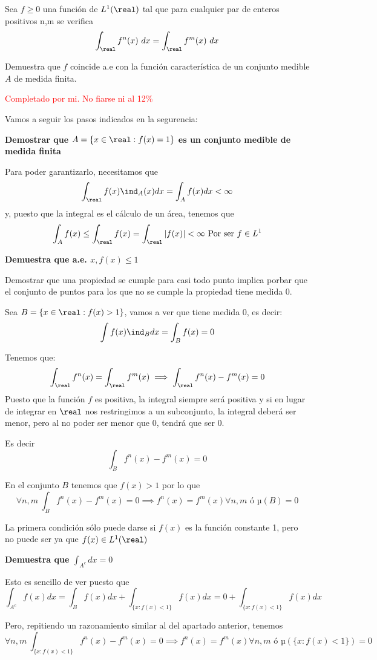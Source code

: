 \begin{problem}[15]
Sea $f\geq 0$ una función de $L^1(\real)$ tal que para cualquier par de enteros positivos n,m se verifica
\[\int_{\real} f^n(x) \ dx=\int_{\real}f^m(x) \ dx\]

Demuestra que $f$ coincide a.e con la función característica de un conjunto medible $A$ de medida finita.

\solution
\textcolor{red}{Completado por mi. No fiarse ni al 12\%}

Vamos a seguir los pasos indicados en la segurencia:

\spart
\textbf{Demostrar que $A=\{x \in \real: f(x)=1\}$ es un conjunto medible de medida finita}

Para poder garantizarlo, necesitamos que
\[\int_{\real}f(x)\ind_A(x) dx = \int_A f(x) dx < \infty\]
y, puesto que la integral es el cálculo de un área, tenemos que
\[\int_A f(x) \leq \int_{\real}f(x) = \int_{\real}|f(x)| <\infty \text{ Por ser } f\in L^1\]

\spart
\textbf{Demuestra que a.e. $x, f(x) \leq 1$}

Demostrar que una propiedad se cumple para casi todo punto implica porbar que el conjunto de puntos para los que no se cumple la propiedad tiene medida 0.

Sea $B=\{x \in \real : f(x) > 1\}$, vamos a ver que tiene medida 0, es decir:
\[\int f(x) \ind_B dx = \int_B f(x) = 0\]

Tenemos que:
\[\int_{\real}f^n(x) = \int_{\real}f^m(x) \implies \int_{\real}f^n(x)-f^m(x) = 0\]
Puesto que la función $f$ es positiva, la integral siempre será positiva y si en lugar de integrar en $\real$ nos restringimos a un subconjunto, la integral deberá ser menor, pero al no poder ser menor que 0, tendrá que ser 0.

Es decir
\[\int_B f^n(x)-f^m(x) = 0\]

En el conjunto $B$ tenemos que $f(x) > 1$ por lo que
\[\forall n,m \ \int_B f^n(x)-f^m(x) = 0 \implies f^n(x)=f^m(x) \forall n,m \text{ ó } µ(B) = 0\]

La primera condición sólo puede darse si $f(x)$ es la función constante 1, pero no puede ser ya que $f(x) \in L^1(\real)$

\spart
\textbf{Demuestra que $\int_{A^c}dx = 0$}

Esto es sencillo de ver puesto que
\[\int_{A^c}f(x) dx = \int_B f(x)dx + \int_{\{x: f(x)<1\}} f(x)dx = 0 + \int_{\{x: f(x)<1\}} f(x)dx\]

Pero, repitiendo un razonamiento similar al del apartado anterior, tenemos
\[\forall n,m \ \int_{\{x: f(x)<1\}} f^n(x)-f^m(x) = 0 \implies f^n(x)=f^m(x) \forall n,m \text{ ó } µ(\{x: f(x)<1\}) = 0\]


\end{problem}
